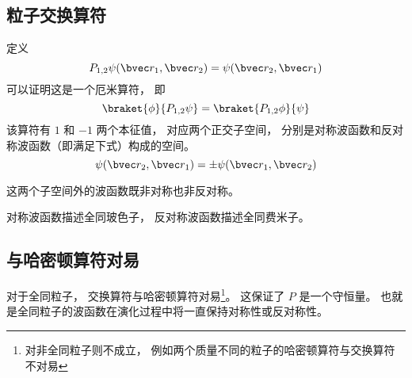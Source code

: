 

\subsection{粒子交换算符}

定义
\begin{equation}
P_{1,2}\psi(\bvec r_1, \bvec r_2) = \psi(\bvec r_2, \bvec r_1)
\end{equation}
可以证明这是一个厄米算符， 即
\begin{equation}
\braket{\phi}{P_{1,2}\psi} = \braket{P_{1,2}\phi}{\psi}
\end{equation}
该算符有 $1$ 和 $-1$ 两个本征值， 对应两个正交子空间， 分别是对称波函数和反对称波函数（即满足下式）构成的空间。
\begin{equation}
\psi(\bvec r_2, \bvec r_1) = \pm\psi(\bvec r_1, \bvec r_2)
\end{equation}

这两个子空间外的波函数既非对称也非反对称。

对称波函数描述全同玻色子， 反对称波函数描述全同费米子。

\subsection{与哈密顿算符对易}

对于全同粒子， 交换算符与哈密顿算符对易\footnote{对非全同粒子则不成立， 例如两个质量不同的粒子的哈密顿算符与交换算符不对易}。 这保证了 $P$ 是一个守恒量。 也就是全同粒子的波函数在演化过程中将一直保持对称性或反对称性。
